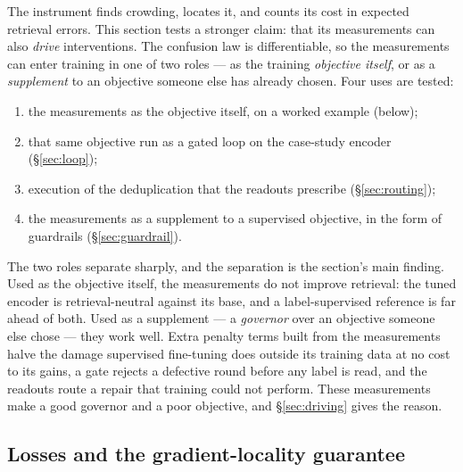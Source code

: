 \documentclass[11pt,letterpaper]{article}
\begin{document}
The instrument finds crowding, locates it, and counts its cost in expected
retrieval errors. This section tests a stronger claim: that its
measurements can also \emph{drive} interventions. The confusion law is
differentiable, so the measurements can enter training in one of two roles
--- as the training \emph{objective itself}, or as a \emph{supplement} to
an objective someone else has already chosen. Four uses are tested:
\begin{enumerate}
\item the measurements as the objective itself, on a worked example
  (below);
\item that same objective run as a gated loop on the case-study encoder
  (\S\ref{sec:loop});
\item execution of the deduplication that the readouts prescribe
  (\S\ref{sec:routing});
\item the measurements as a supplement to a supervised objective, in the
  form of guardrails (\S\ref{sec:guardrail}).
\end{enumerate}
The two roles separate sharply, and the separation is the section's main
finding. Used as the objective itself, the measurements do not improve
retrieval: the tuned encoder is retrieval-neutral against its base, and a
label-supervised reference is far ahead of both. Used as a supplement ---
a \emph{governor} over an objective someone else chose --- they work
well. Extra penalty terms built from the measurements halve the damage
supervised fine-tuning does outside its training data at no cost to its
gains, a gate rejects a defective round before any label is read, and the
readouts route a repair that training could not perform. These
measurements make a good governor and a poor objective, and
\S\ref{sec:driving} gives the reason.

\subsection{Losses and the gradient-locality guarantee}
\end{document}
